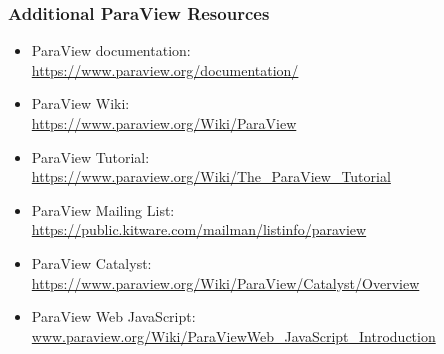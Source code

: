 \begin{frame}

  \frametitle{Additional ParaView Resources}

  \begin{itemize}
      \item ParaView documentation:\\
        \url{https://www.paraview.org/documentation/}
      \item ParaView Wiki:\\
        \url{https://www.paraview.org/Wiki/ParaView}
      \item ParaView Tutorial:\\
        \url{https://www.paraview.org/Wiki/The\_ParaView\_Tutorial}
      \item ParaView Mailing List:\\
        \url{https://public.kitware.com/mailman/listinfo/paraview}
      \item ParaView Catalyst:\\
        \url{https://www.paraview.org/Wiki/ParaView/Catalyst/Overview}
      \item ParaView Web JavaScript:\\
        \url{www.paraview.org/Wiki/ParaViewWeb\_JavaScript\_Introduction}
  \end{itemize}

\end{frame}

